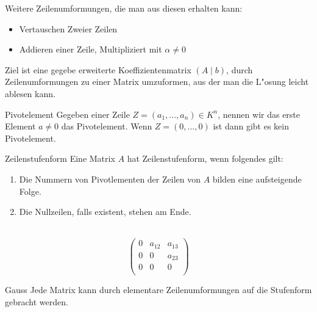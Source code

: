 \documentclass[fontsize=11pt,paper=a4,BCOR=0mm,DIV=11,automark,headsepline]{scrbook}
\theoremstyle{remark}
\theoremstyle{definition}
\theoremstyle{proof}
\theoremstyle{remark}
\begin{document}
Weitere Zeilenumformungen, die man aus diesen erhalten kann:
\begin{relation}
\begin{itemize}
\item Vertauschen Zweier Zeilen
\item Addieren einer Zeile, Multipliziert mit \(\alpha \not= 0\)
\end{itemize}
\end{relation}

Ziel ist eine gegebe erweiterte Koeffizientenmatrix \((A\mid b)\), durch
Zeilenumformungen zu einer Matrix umzuformen, aus der man die L"osung leicht
ablesen kann.

\begin{definition}{Pivotelement}{}
Gegeben einer Zeile \(Z=(a_1,...,a_n)\in K^n\), nennen wir das erste Element
\(a\not= 0\) das Pivotelement.
Wenn \(Z=(0,...,0)\) ist dann gibt es kein Pivotelement.
\end{definition}

\begin{definition}{Zeilenstufenform}{}
Eine Matrix \(A\) hat Zeilenstufenform, wenn folgendes gilt:
\begin{enumerate}
\item Die Nummern von Pivotlementen der Zeilen von \(A\) bilden eine aufsteigende
Folge.
\item Die Nullzeilen, falls existent, stehen am Ende.
\end{enumerate}
\end{definition}

\begin{exa} \label{} \
\[
\begin{pmatrix}
 0 & a_{12} & a_{13} \\
 0 & 0 & a_{23} \\
 0 & 0 & 0 \\
\end{pmatrix}
\]
\end{exa}

\begin{theo}{Gauss}{}
Jede Matrix kann durch elementare Zeilenumformungen auf die Stufenform gebracht
werden.
\end{theo}
\end{document}

